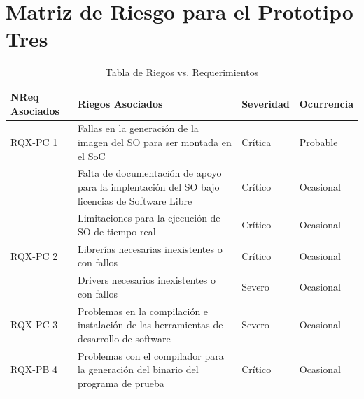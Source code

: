 		\section{Matriz de Riesgo para el Prototipo Tres} 

		\begin{table}[h!]
		\centering
		\begin{tabular}{ p{2.5cm} p{9cm} p{2cm} p{2cm} }
		\hline 
		\rowcolor[gray]{0.8} N\textordmasculine Req Asociados& Riegos Asociados & Severidad  & Ocurrencia \\
		\hline
		RQX-PC 1& Fallas en la generación de la imagen del SO para ser montada en el SoC & Crítica       & Probable \\
		\hline				
				& Falta de documentación de apoyo para la implentación del SO bajo licencias de Software Libre & Crítico & Ocasional\\	
		\hline				
				 & Limitaciones para la ejecución de SO de tiempo real & Crítico & Ocasional\\	
 		
 		\hline	
		RQX-PC 2 	& Librerías necesarias inexistentes o con fallos& Crítico & Ocasional\\	
		
		\hline				
 					 & Drivers necesarios inexistentes o con fallos  & Severo  &  Ocasional\\ 
		\hline	
 		RQX-PC 3	&Problemas en la compilación e instalación de las herramientas de desarrollo de software& Severo  &  Ocasional\\ 
		\hline
		RQX-PB 4 & Problemas con el compilador para la generación del binario del programa de prueba  & Crítico&  Ocasional\\
		\hline
		\end{tabular}
		\caption{Tabla de Riegos vs. Requerimientos}
		\end{table}

\newpage


